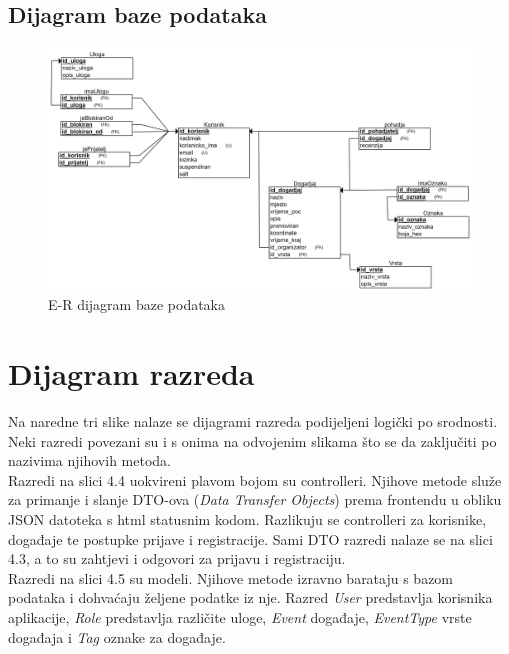 				
			
			
				
				
			
			\subsection{Dijagram baze podataka}
				
				
			\begin{figure}[h]
				\includegraphics[width=\textwidth]{dijagrami/Baza podataka/REL shema.png}
				\caption{E-R dijagram baze podataka}
			\end{figure}
				
			\eject
			
			
		\section{Dijagram razreda}
			
			\indent Na naredne tri slike nalaze se dijagrami razreda podijeljeni logički po srodnosti. Neki razredi povezani su i s onima na odvojenim slikama što se da zaključiti po nazivima njihovih metoda. \\
			
			\indent Razredi na slici 4.4 uokvireni plavom bojom su controlleri. Njihove metode služe za primanje i slanje DTO-ova (\textit{Data Transfer Objects})  prema frontendu u obliku JSON datoteka s html statusnim kodom. Razlikuju se controlleri za korisnike, događaje te postupke prijave i registracije. Sami DTO razredi nalaze se na slici 4.3, a to su zahtjevi i odgovori za prijavu i registraciju.\\
			
			\indent Razredi na slici 4.5 su modeli. Njihove metode izravno barataju s bazom podataka i dohvaćaju željene podatke iz nje. Razred \textit{User} predstavlja korisnika aplikacije, \textit{Role} predstavlja različite uloge, \textit{Event} događaje, \textit{EventType} vrste događaja i \textit{Tag} oznake za događaje.
			
